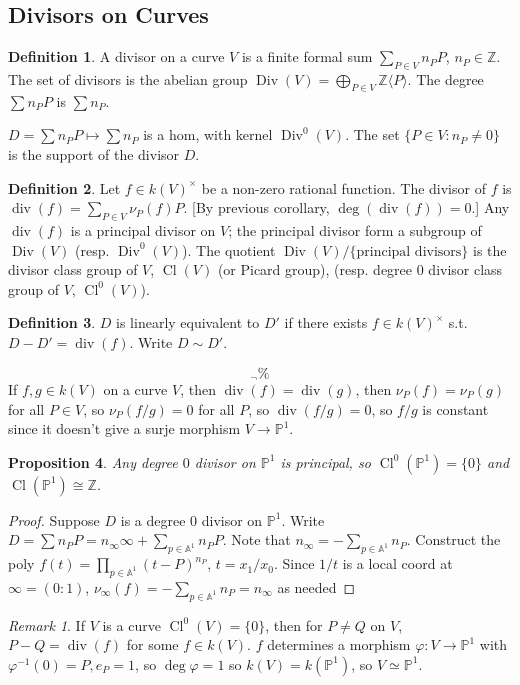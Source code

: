 \documentclass{article}
\theoremstyle{definition}
\newtheorem{defn}{Definition}[section]
\theoremstyle{remark}
\newtheorem{rem}{Remark}
\theoremstyle{plain}
\newtheorem{prop}[defn]{Proposition}
\newcommand{\ZZ}{\mathbb{Z}}
\newcommand{\PP}{\mathbb{P}}
\newcommand{\bA}{\mathbb{A}}
\newcommand{\cl}{\operatorname{Cl}}
\begin{document}
\subsection{Divisors on Curves}
\begin{defn}
    A divisor on a curve $V$ is a finite formal sum $\sum_{P\in V}n_PP$, $n_P\in\ZZ$. The set of divisors is the abelian group $\operatorname{Div}(V)=\bigoplus_{P\in V}\ZZ\langle P\rangle$. The degree $\sum n_PP$ is $\sum n_P$. 
\end{defn}
$D=\sum n_PP\mapsto \sum n_P$ is a hom, with kernel $\operatorname{Div}^0(V)$. The set $\{P\in V:n_P\neq 0\}$ is the support of the divisor $D$.
\begin{defn}
    Let $f\in k(V)^\times$ be a non-zero rational function. The divisor of $f$ is $\operatorname{div}(f)=\sum_{P\in V}\nu_P(f)P$. [By previous corollary, $\deg(\operatorname{div}(f))=0$.] Any $\operatorname{div}(f)$ is a principal divisor on $V$; the principal divisor form a subgroup of $\operatorname{Div}(V)$ (resp. $\operatorname{Div}^0(V)$). The quotient $\operatorname{Div}(V)/\{\text{principal divisors}\}$ is the divisor class group of $V$, $\cl(V)$ (or Picard group), (resp. degree $0$ divisor class group of $V$, $\cl^0(V)$). 
\end{defn}
\begin{defn}
    $D$ is linearly equivalent to $D'$ if there exists $f\in k(V)^\times$ s.t. $D-D'=\operatorname{div}(f)$. Write $D\sim D'$.
\end{defn}
\[{}_\neg\%\tag{Owen's Signature}\]
If $f,g\in k(V)$ on a curve $V$, then $\operatorname{div}(f)=\operatorname{div}(g)$, then $\nu_P(f)=\nu_P(g)$ for all $P\in V$, so $\nu_P(f/g)=0$ for all $P$, so $\operatorname{div}(f/g)=0$, so $f/g$ is constant since it doesn't give a surje morphism $V\to\PP^1$.
\begin{prop}
    Any degree $0$ divisor on $\PP^1$ is principal, so $\cl^0(\PP^1)=\{0\}$ and $\cl(\PP^1)\cong\ZZ$.
\end{prop}
\begin{proof}
    Suppose $D$ is a degree $0$ divisor on $\PP^1$. Write $D=\sum n_PP=n_\infty\infty+\sum_{p\in\bA^1}n_PP$. Note that $n_\infty=-\sum_{p\in\bA^1}n_P$. Construct the poly $f(t)=\prod_{p\in\bA^1}(t-P)^{n_P}$, $t=x_1/x_0$. Since $1/t$ is a local coord at $\infty=(0:1)$, $\nu_\infty(f)=-\sum_{p\in\bA^1}n_P=n_\infty$ as needed
\end{proof}
\begin{rem}
    If $V$ is a curve $\cl^0(V)=\{0\}$, then for $P\neq Q$ on $V$, $P-Q=\operatorname{div}(f)$ for some $f\in k(V)$. $f$ determines a morphism $\varphi:V\to\PP^1$ with $\varphi^{-1}(0)=P,e_P=1$, so $\deg\varphi=1$ so $k(V)=k(\PP^1)$, so $V\simeq\PP^1$.
\end{rem}
\end{document}
